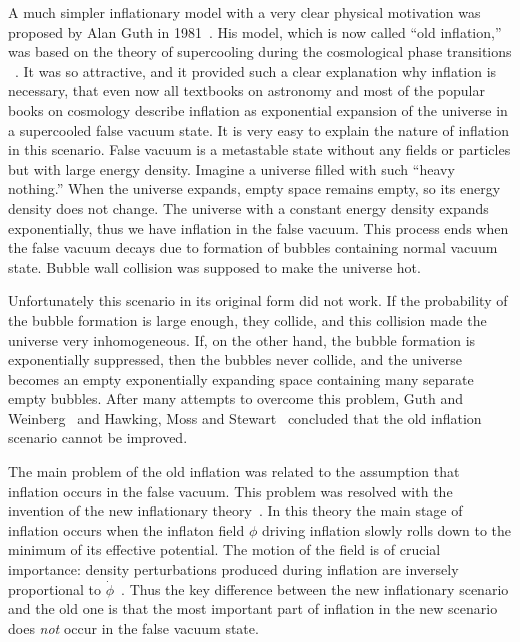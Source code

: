 \documentclass[a4paper,12pt]{article}
\begin{document}
A much simpler inflationary model with a very clear physical motivation was proposed
by Alan Guth  in 1981~\cite{Guth}.  His model, which is now called ``old
inflation,'' was based on the theory of supercooling during the
cosmological phase transitions ~\cite{Kirzhnits}. It was so attractive, and it provided such a clear explanation why inflation is necessary,
that even now all textbooks on astronomy and most of the popular books
on cosmology  describe   inflation as   exponential expansion of the
universe in a supercooled false vacuum state. It is very easy to
explain the nature of inflation in this scenario. False vacuum is a
metastable state without any fields or particles but with large  energy
density. Imagine a universe filled with such ``heavy nothing.'' When the
universe expands, empty space remains empty, so its energy density does
not change. The universe with a constant energy density expands
exponentially, thus we have inflation in the false vacuum. This process ends when the false vacuum decays due to formation of bubbles containing normal vacuum state. Bubble wall collision was supposed to make the universe hot.

Unfortunately this scenario in its original form did not work. If the probability 
of the bubble formation is large enough, they collide, and this collision made the universe very inhomogeneous. If, on the other hand, the bubble formation is exponentially suppressed, then the bubbles never collide, and the universe becomes an empty exponentially expanding space containing many separate empty bubbles.  After many attempts to overcome this problem, Guth and Weinberg~\cite{GW} and Hawking,  Moss and  Stewart~\cite{HMS}  concluded that the old   inflation scenario
cannot be improved.

The main problem of the old inflation was related to the assumption that inflation occurs in the false vacuum.  This problem was resolved with the invention of the new
inflationary theory~\cite{New}. In this theory the main stage of inflation occurs  when the inflaton field $\phi$ driving inflation  slowly rolls down to the minimum of its effective potential.  The motion of the field is of crucial importance: density perturbations produced during inflation   are inversely proportional to $\dot \phi$~\cite{Mukh,Hawk}. Thus the key difference between the new inflationary scenario and the old one is that the most important part of inflation in the new scenario does {\it not} occur in the false vacuum state.
\end{document}

